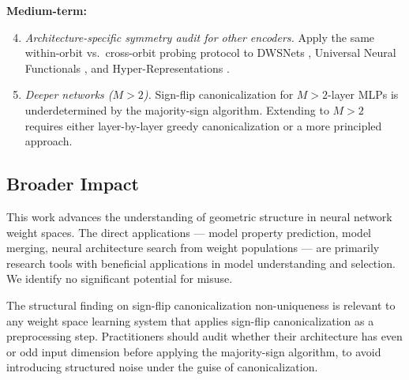 \textbf{Medium-term:}

\begin{enumerate}
\setcounter{enumi}{3}
\item \textit{Architecture-specific symmetry audit for other encoders.} Apply the same within-orbit vs.\ cross-orbit probing protocol to DWSNets \citep{Navon2023EquivariantArchitectures}, Universal Neural Functionals \citep{Kofinas2024UniversalNeuralFunctionals}, and Hyper-Representations \citep{Schurholt2021HyperRepresentations}.

\item \textit{Deeper networks ($M>2$).} Sign-flip canonicalization for $M>2$-layer MLPs is underdetermined by the majority-sign algorithm. Extending to $M>2$ requires either layer-by-layer greedy canonicalization or a more principled approach.
\end{enumerate}

\subsection{Broader Impact}

This work advances the understanding of geometric structure in neural network weight spaces. The direct applications --- model property prediction, model merging, neural architecture search from weight populations --- are primarily research tools with beneficial applications in model understanding and selection. We identify no significant potential for misuse.

The structural finding on sign-flip canonicalization non-uniqueness is relevant to any weight space learning system that applies sign-flip canonicalization as a preprocessing step. Practitioners should audit whether their architecture has even or odd input dimension before applying the majority-sign algorithm, to avoid introducing structured noise under the guise of canonicalization.
